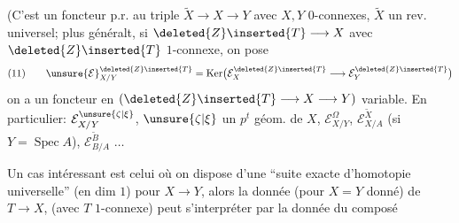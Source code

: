 
(C'est un foncteur p.r. au triple $\widetilde X\longrightarrow X\longrightarrow Y$ avec $X,Y$ $0$-connexes, $\widetilde X$ un rev. universel; plus généralt, si $\deleted{Z}\inserted{T}\longrightarrow X$ avec $\deleted{Z}\inserted{T}$ $1$-connexe, on pose
\[
(11)\qquad \unsure{\mathcal E}_{X/Y}^{\deleted{Z}\inserted{T}}=\operatorname{Ker}\bigl(\mathcal E_X^{\deleted{Z}\inserted{T}}\longrightarrow\mathcal E_Y^{\deleted{Z}\inserted{T}}\bigr)
\]
on a un foncteur en  $(\deleted{Z}\inserted{T}\longrightarrow X\longrightarrow Y)$ variable. En particulier: $\mathcal E_{X/Y}^{\unsure{\zeta|\xi}}$, $\unsure{\zeta|\xi}$ un $p^t$ géom. de $X$, $\mathcal E_{X/Y}^{\Omega}$, $\mathcal E_{X/A}^{\widetilde X}$ (si $Y=\operatorname{Spec} A$), $\mathcal E_{B/A}^{\widetilde B}$ $\ldots$


Un cas intéressant est celui où on dispose d'une ``suite exacte d'homotopie universelle''  (en dim $1$) pour $X\longrightarrow Y$, alors la donnée (pour $X=Y$ donné) de $T\longrightarrow X$, (avec $T$ $1$-connexe) peut s'interpréter par la donnée du composé


